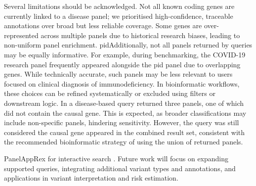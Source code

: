 Several limitations should be acknowledged. 
Not all known coding genes are currently linked to a disease panel; we prioritised high-confidence, traceable annotations over broad but less reliable coverage. 
Some genes are over-represented across multiple panels due to historical research biases, leading to non-uniform panel enrichment. 
\DIFaddbegin {}\ac{pid}\DIFaddend Additionally, not all panels returned by queries may be equally informative. 
For example, during benchmarking, the COVID-19 research panel frequently appeared alongside the \ac{pid} panel due to overlapping genes. 
While technically accurate, such panels may be less relevant to users focused on clinical  diagnosis of immunodeficiency.
In bioinformatic workflows, these choices can be refined systematically or excluded using filters or downstream logic.
In \DIFdelbegin {}\DIFdelend \DIFaddbegin {}\DIFaddend a disease-based query returned three panels, one of which did not contain the causal gene. This is expected, as broader classifications may include non-specific panels, hindering sensitivity. 
However, the query was still considered \DIFdelbegin {}\DIFdelend \DIFaddbegin {}\DIFaddend the causal gene appeared in the combined result set, consistent with the recommended bioinformatic strategy of using the union of returned panels.
\DIFaddbegin {}\DIFaddend 

PanelAppRex \DIFdelbegin {}\DIFdelend \DIFaddbegin {}\DIFaddend for interactive search \DIFdelbegin {}\DIFdelend \DIFaddbegin {}\DIFaddend . 
Future work will focus on expanding supported queries, integrating additional variant types and annotations, and \DIFdelbegin {}\DIFdelend \DIFaddbegin {}\DIFaddend applications in variant interpretation and risk estimation.

